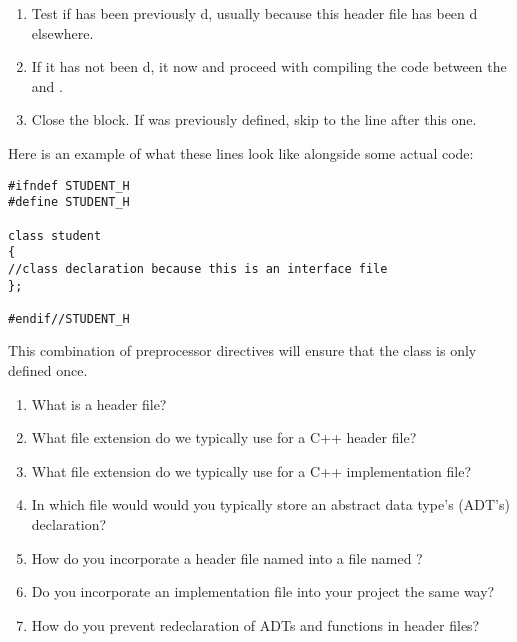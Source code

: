 \begin{enumerate}
\item Test if  has been previously d, usually because this header file has been d elsewhere.
\item If it has not been d,  it now and proceed with compiling the code between the  and .
\item Close the  block. If  was previously defined, skip to the line after this one.
\end{enumerate}

\noindent Here is an example of what these lines look like alongside some actual code:

\noindent\begin{minipage}{\linewidth}\begin{lstlisting}
#ifndef STUDENT_H
#define STUDENT_H

class student
{
//class declaration because this is an interface file
};

#endif//STUDENT_H
\end{lstlisting}\end{minipage}

This combination of preprocessor directives will ensure that the  class is only defined once.



\begin{enumerate}
	\item What is a header file?

	\item What file extension do we typically use for a C++ header file?

	\item What file extension do we typically use for a C++ implementation file?

  \item In which file would would you typically store an abstract data type's (ADT's) declaration?

	\item How do you incorporate a header file named  into a file named ?

	\item Do you incorporate an implementation file into your project the same way?

	\item How do you prevent redeclaration of ADTs and functions in header files?
\end{enumerate}

